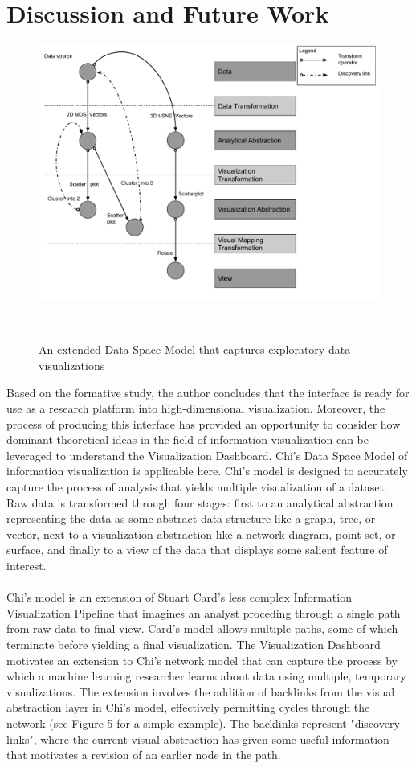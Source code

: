 \documentclass{sigchi}
\begin{document}
\section{Discussion and Future Work}%
%
\begin{figure}
  \centering
  \includegraphics[width=1.5\columnwidth]{figures/extended}
  \caption{An extended Data Space Model that captures exploratory data visualizations}~\label{fig:figure2}
\end{figure}
%
Based on the formative study, the author concludes that the interface is ready for use as a research platform into high-dimensional visualization.%
%
Moreover, the process of producing this interface has provided an opportunity to consider how dominant theoretical ideas in the field of information visualization can be leveraged to understand the Visualization Dashboard. %
%
Chi's Data Space Model of information visualization is applicable here.
%
Chi's model is designed to accurately capture the process of analysis that yields multiple visualization of a dataset. %
%
Raw data is transformed through four stages: first to an analytical abstraction representing the data as some abstract data structure like a graph, tree, or vector, next to a visualization abstraction like a network diagram, point set, or surface, and finally to a view of the data that displays some salient feature of interest. %
%
\\\\
%
Chi's model is an extension of Stuart Card's less complex Information Visualization Pipeline that imagines an analyst proceding through a single path from raw data to final view. %
%
Card's model allows multiple paths, some of which terminate before yielding a final visualization. %
%
The Visualization Dashboard motivates an extension to Chi's network model that can capture the process by which a machine learning researcher learns about data using multiple, temporary visualizations. %
%
The extension involves the addition of backlinks from the visual abstraction layer in Chi's model, effectively permitting cycles through the network (see Figure 5 for a simple example). %
%
The backlinks represent "discovery links", where the current visual abstraction has given some useful information that motivates a revision of an earlier node in the path.
%
\end{document}
